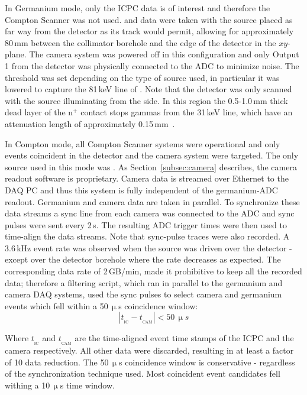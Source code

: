 In Germanium mode, only the ICPC data is of interest and therefore the Compton Scanner was not used. \BaS{} and \ThS{} data were taken with the \CsS{} source placed as far way from the detector as its track would permit, allowing for approximately 80\,mm between the collimator borehole and the edge of the detector in the $xy$-plane. The camera system was powered off in this configuration and only Output 1 from the detector was physically connected to the ADC to minimize noise. The threshold was set depending on the type of source used, in particular it was lowered to capture the 81\,keV line of \BaS{}. Note that the detector was only scanned with the \BaS{} source illuminating from the side. In this region the 0.5-1.0\,mm thick dead layer of the n$^+$ contact stops gammas from the 31\,keV line, which have an attenuation length of approximately 0.15\,mm~\cite{NIST}. 

In Compton mode, all Compton Scanner systems were operational and only events coincident in the detector and the camera system were targeted. The only source used in this mode was \CsS{}. As Section~\ref{subsec:camera} describes, the camera readout software is proprietary. Camera data is streamed over Ethernet to the DAQ PC and thus this system is fully independent of the germanium-ADC readout. Germanium and camera data are taken in parallel. To synchronize these data streams a sync line from each camera was connected to the ADC and sync pulses were sent every 2\,s. The resulting ADC trigger times were then used to time-align the data streams. Note that sync-pulse traces were also recorded. A 3.6\,kHz event rate was observed when the \CsS{} source was driven over the detector - except over the detector borehole where the rate decreases as expected. The corresponding data rate of 2\,GB/min, made it prohibitive to keep all the recorded data; therefore a filtering script, which ran in parallel to the germanium and camera DAQ systems, used the sync pulses to select camera and germanium events which fell within a 50\,$\upmu$s coincidence window: 
\begin{equation}
	\left|t_{_{\text{IC}}} - t_{_{\text{CAM}}}\right| < 50\,\upmu s
	\label{eq:coincidence_window}
\end{equation}

Where $t_{_{\text{IC}}}$ and $t_{_{\text{CAM}}}$ are the time-aligned event time stamps of the ICPC and the camera respectively. All other data were discarded, resulting in at least a factor of 10 data reduction. The 50\,$\upmu$s coincidence window is conservative - regardless of the synchronization technique used. Most coincident event candidates fell withing a 10\,$\upmu$s time window. 

